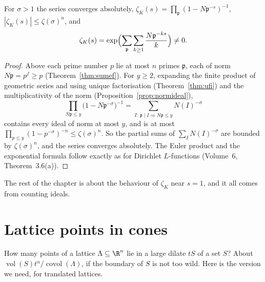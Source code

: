 \begin{proposition}\label{prop:zetaK}
For $\sigma>1$ the series converges absolutely, $\zeta_K(s)=\prod_{\mathfrak p}(1-N\mathfrak p^{-s})^{-1}$, $|\zeta_K(s)|\le\zeta(\sigma)^n$,
and
\[
\zeta_K(s)=\exp\Bigl(\sum_{\mathfrak p}\sum_{k\ge1}\frac{N\mathfrak p^{-ks}}k\Bigr)\ne0.
\]
\end{proposition}
\begin{proof}
Above each prime number $p$ lie at most $n$ primes $\mathfrak p$, each of norm $N\mathfrak p=p^{f}\ge p$ (Theorem~\ref{thm:sumef}).
For $y\ge2$, expanding the finite product of geometric series and using unique factorisation (Theorem~\ref{thm:ufi}) and the
multiplicativity of the norm (Proposition~\ref{prop:normideal}),
\[
\prod_{N\mathfrak p\le y}\bigl(1-N\mathfrak p^{-\sigma}\bigr)^{-1}=\sum_{I:\ \mathfrak p\mid I\Rightarrow N\mathfrak p\le y}N(I)^{-\sigma}
\]
contains every ideal of norm at most $y$, and is at most $\prod_{p\le y}(1-p^{-\sigma})^{-n}\le\zeta(\sigma)^n$. So the partial sums of
$\sum_IN(I)^{-\sigma}$ are bounded by $\zeta(\sigma)^n$, and the series converges absolutely. The Euler product and the exponential
formula follow exactly as for Dirichlet $L$-functions (Volume~6, Theorem~3.6(a)).
\end{proof}

The rest of the chapter is about the behaviour of $\zeta_K$ near $s=1$, and it all comes from counting ideals.

\section{Lattice points in cones}

How many points of a lattice $\Lambda\subseteq\R^n$ lie in a large dilate $tS$ of a set $S$? About $\operatorname{vol}(S)t^n/
\operatorname{covol}(\Lambda)$, if the boundary of $S$ is not too wild. Here is the version we need, for translated lattices.

